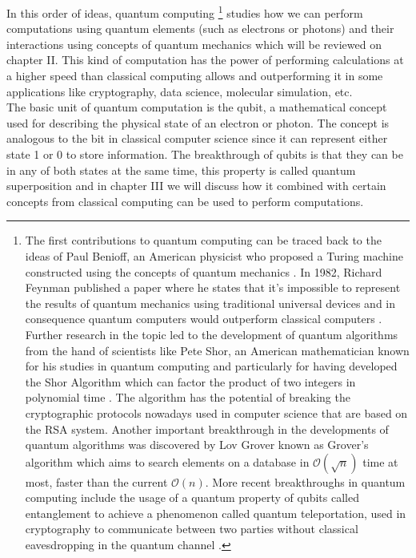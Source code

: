 \documentclass[12pt,a4paper]{scrartcl}
\begin{document}
In this order of ideas, quantum computing 
\footnote{
The first contributions to quantum computing can be traced back to the ideas of Paul Benioff, an American physicist who proposed a Turing machine constructed using the concepts of quantum mechanics \cite{Benioff1982}. In 1982, Richard Feynman published a paper where he states that it’s impossible to represent the results of quantum mechanics using traditional universal devices and in consequence quantum computers would outperform classical computers \cite{Feynman1982}. Further research in the topic led to the development of quantum algorithms from the hand of scientists like Pete Shor, an American mathematician known for his studies in quantum computing and particularly for having developed the Shor Algorithm which can factor the product of two integers in polynomial time \cite{Shor1994}. The algorithm has the potential of breaking the cryptographic protocols nowadays used in computer science that are based on the RSA system. Another important breakthrough in the developments of quantum algorithms was discovered by Lov Grover known as Grover’s algorithm \cite{Grover1996} which aims to search elements on a database in $\mathcal{O}(\sqrt{n})$ time at most, faster than the current $\mathcal{O}(n)$.  More recent breakthroughs in quantum computing include the usage of a quantum property of qubits called entanglement to achieve a phenomenon called quantum teleportation, used in cryptography to communicate between two parties without classical eavesdropping in the quantum channel \cite{Ren2017}.
}
studies how we can perform computations using quantum elements (such as electrons or photons) and their interactions using concepts of quantum mechanics which will be reviewed on chapter II. This kind of computation has the power of performing calculations at a higher speed than classical computing allows \cite{Feynman1982} and outperforming it in some applications like cryptography, data science, molecular simulation, etc.  \\

The basic unit of quantum computation is the qubit, a mathematical concept used for describing the physical state of an electron or photon. The concept is analogous to the bit in classical computer science since it can represent either state 1 or 0 to store information. The breakthrough of qubits is that they can be in any of both states at the same time, this property is called quantum superposition and in chapter III we will discuss how it combined with certain concepts from classical computing can be used to perform computations. \\
\end{document}
